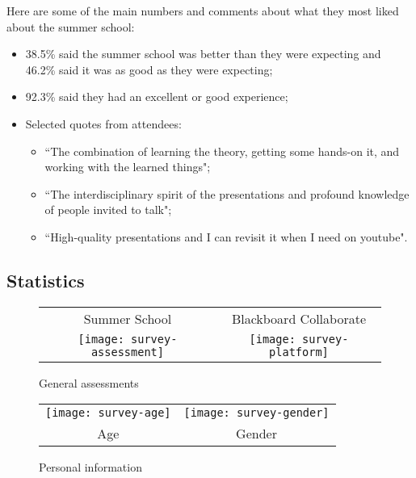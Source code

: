 Here are some of the main numbers and comments about what they most liked about the summer school:

\begin{itemize}

\item 38.5\% said the summer school was better than they were expecting and 46.2\% said it was as good as they were expecting;

\item 92.3\% said they had an excellent or good experience;

\item Selected quotes from attendees:

\begin{itemize}

\item ``The combination of learning the theory, getting some hands-on it, and working with the learned things";
\item ``The interdisciplinary spirit of the presentations and profound knowledge of people invited to talk";
\item ``High-quality presentations and I can revisit it when I need on youtube".

\end{itemize}

\end{itemize}

\subsection{Statistics}

\begin{figure}[H]
\centering
\begin{tabular}{cc}
Summer School & \hspace{1cm} Blackboard Collaborate \\
\hspace{-2.5cm} \texttt{[image: survey-assessment]} &
\texttt{[image: survey-platform]}
\end{tabular}
\caption{General assessments}
\end{figure}

\begin{figure}[H]
\centering
\begin{tabular}{cc}
\texttt{[image: survey-age]} &
\texttt{[image: survey-gender]} \\
\hspace{-3.5cm} Age & \hspace{-3cm} Gender
\end{tabular}
\caption{Personal information}
\end{figure}

